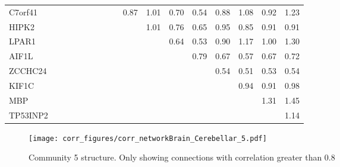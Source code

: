 \begin{longtable}{lrrrrrrrrrrrrrrrr}
C7orf41  &             &              &            &            &            &            &            &               &        0.87 &        1.01 &        0.70 &          0.54 &        0.88 &      1.08 &           0.92 &        1.23 \\
HIPK2    &             &              &            &            &            &            &            &               &             &        1.01 &        0.76 &          0.65 &        0.95 &      0.85 &           0.91 &        0.91 \\
LPAR1    &             &              &            &            &            &            &            &               &             &             &        0.64 &          0.53 &        0.90 &      1.17 &           1.00 &        1.30 \\
AIF1L    &             &              &            &            &            &            &            &               &             &             &             &          0.79 &        0.67 &      0.57 &           0.67 &        0.72 \\
ZCCHC24  &             &              &            &            &            &            &            &               &             &             &             &               &        0.54 &      0.51 &           0.53 &        0.54 \\
KIF1C    &             &              &            &            &            &            &            &               &             &             &             &               &             &      0.94 &           0.91 &        0.98 \\
MBP      &             &              &            &            &            &            &            &               &             &             &             &               &             &           &           1.31 &        1.45 \\
TP53INP2 &             &              &            &            &            &            &            &               &             &             &             &               &             &           &                &        1.14 \\
\end{longtable}


\begin{figure}[h!]
\centering
\texttt{[image: corr\_figures/corr\_networkBrain\_Cerebellar\_5.pdf]}
\caption{Community 5 structure. Only showing connections with correlation greater than 0.8}
\end{figure}




